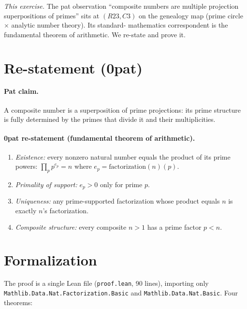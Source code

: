 \documentclass[sigplan,10pt,anonymous,review]{acmart}
\begin{document}
\emph{This exercise.} The pat observation ``composite numbers are multiple
projection superpositions of primes'' sits at $(R23, C3)$ on the genealogy
map (prime circle $\times$ analytic number theory). Its standard-
mathematics correspondent is the fundamental theorem of arithmetic. We
re-state and prove it.

\section{Re-statement (0pat)}

\paragraph{Pat claim.} A composite number is a superposition of prime
projections: its prime structure is fully determined by the primes that
divide it and their multiplicities.

\paragraph{0pat re-statement (fundamental theorem of arithmetic).}
\begin{enumerate}
\item \emph{Existence:} every nonzero natural number equals the product of
its prime powers: $\prod_{p} p^{e_p} = n$ where $e_p =
\mathrm{factorization}(n)(p)$.
\item \emph{Primality of support:} $e_p > 0$ only for prime $p$.
\item \emph{Uniqueness:} any prime-supported factorization whose product
equals $n$ is exactly $n$'s factorization.
\item \emph{Composite structure:} every composite $n > 1$ has a prime
factor $p < n$.
\end{enumerate}

\section{Formalization}

The proof is a single Lean file (\texttt{proof.lean}, 90 lines), importing
only \texttt{Mathlib.Data.Nat.Factorization.Basic} and
\texttt{Mathlib.Data.Nat.Basic}. Four theorems:
\end{document}
